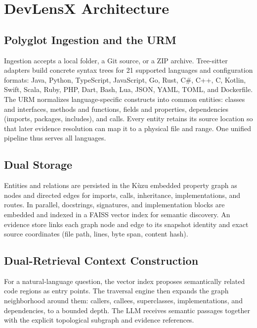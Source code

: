\documentclass[runningheads]{llncs}
\begin{document}
\section{DevLensX Architecture}

\subsection{Polyglot Ingestion and the URM}
Ingestion accepts a local folder, a Git source, or a ZIP archive. Tree-sitter adapters build concrete syntax trees for 21 supported languages and configuration formats: Java, Python, TypeScript, JavaScript, Go, Rust, C\#, C++, C, Kotlin, Swift, Scala, Ruby, PHP, Dart, Bash, Lua, JSON, YAML, TOML, and Dockerfile. The URM normalizes language-specific constructs into common entities: classes and interfaces, methods and functions, fields and properties, dependencies (imports, packages, includes), and calls. Every entity retains its source location so that later evidence resolution can map it to a physical file and range. One unified pipeline thus serves all languages.

\subsection{Dual Storage}
Entities and relations are persisted in the Kùzu embedded property graph \cite{feng2023kuzu} as nodes and directed edges for imports, calls, inheritance, implementations, and routes. In parallel, docstrings, signatures, and implementation blocks are embedded and indexed in a FAISS vector index for semantic discovery. An evidence store links each graph node and edge to its snapshot identity and exact source coordinates (file path, lines, byte span, content hash).

\subsection{Dual-Retrieval Context Construction}
For a natural-language question, the vector index proposes semantically related code regions as entry points. The traversal engine then expands the graph neighborhood around them: callers, callees, superclasses, implementations, and dependencies, to a bounded depth. The LLM receives semantic passages together with the explicit topological subgraph and evidence references.
\end{document}
